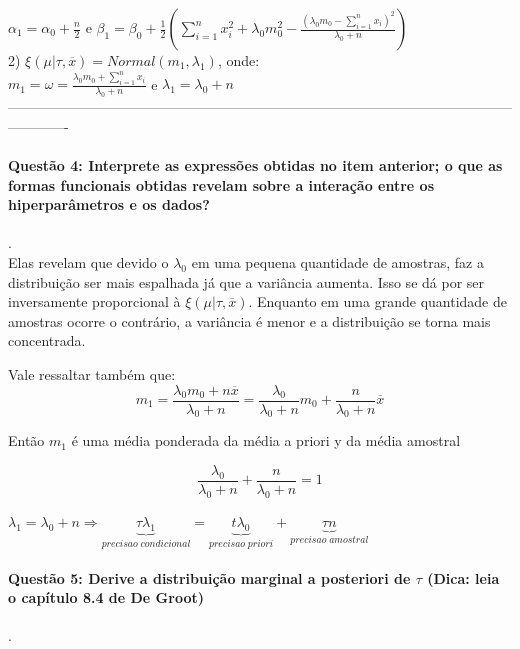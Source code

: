 \documentclass{article}
\begin{document}
	$\alpha_1 = \alpha_0 + \frac{n}{2}$ e $\beta_1 = \beta_0 + \frac{1}{2} (\sum_{i=1}^{n}x_i^2 + \lambda_0 m_0^2 - \frac{(\lambda_0 m_0 - \sum_{i=1}^{n}x_i)^2}{\lambda_0 + n})$\\
	
	 
	2) $\xi(\mu | \tau, \overline{x}) = Normal(m_1, \lambda_1)$, onde:\\
	
	$m_1 = \omega = \frac{\lambda_0 m_0 + \sum_{i=1}^{n}x_i}{\lambda_0 + n}$ e $\lambda_1 = \lambda_0 + n$\\
	
	-------------------------------------------------------------------------------------------------------------------------
	

	
	\paragraph{Questão 4: Interprete as expressões obtidas no item anterior; o que as formas funcionais
	obtidas revelam sobre a interação entre os hiperparâmetros e os dados?}.\\

	Elas revelam que devido o $\lambda_0$ em uma pequena quantidade de amostras, faz a distribuição ser mais espalhada já que a variância aumenta. Isso se dá por ser inversamente proporcional à $\xi(\mu | \tau, \overline{x})$. Enquanto em uma grande quantidade de amostras ocorre o contrário, a variância é menor e a distribuição se torna mais concentrada.

	Vale ressaltar também que:
	$$m_1 = \frac{\lambda_0 m_0 + n \overline{x}}{\lambda_0 + n} = \frac{\lambda_0}{\lambda_0 + n} m_0 + \frac{n}{\lambda_0 + n} \overline{x}$$
	
	Então $m_1$ é uma média ponderada da média a priori y da média amostral
	
	$$\frac{\lambda_0}{\lambda_0 + n} + \frac{n}{\lambda_0 + n} = 1$$
	
	$\lambda_1 = \lambda_0 + n \Rightarrow \underbrace{\tau \lambda_1}_{precisao \; condicional} = \underbrace{t\lambda_0}_{precisao \; priori} + \underbrace{\tau n}_{precisao \; amostral}$ 
	\paragraph{Questão 5: Derive a distribuição marginal a posteriori de $\tau$ (Dica: leia o capítulo 8.4
		de De Groot)}.\\
	
\end{document}
